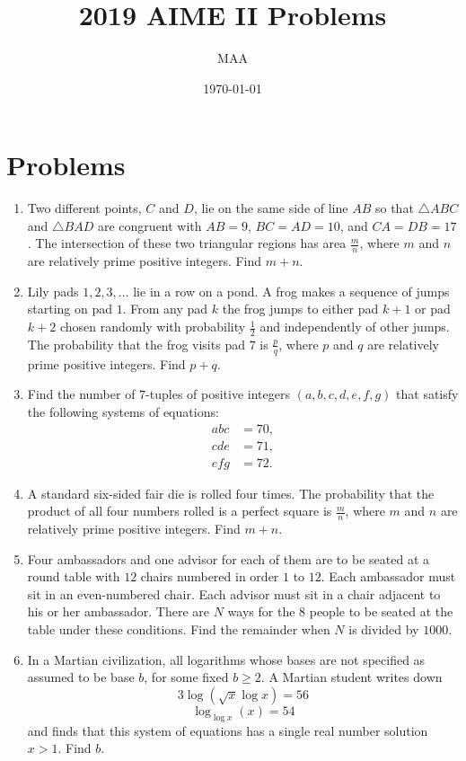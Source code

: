 \documentclass{article}%
\title{2019 AIME II Problems}%
\author{MAA}%
\date{\today}%
\begin{document}
%
\normalsize%
\maketitle%
\section{Problems}%
\label{sec:Problems}%
\begin{enumerate}%
\item%
Two different points, $C$ and $D$, lie on the same side of line $AB$ so that $\triangle ABC$ and $\triangle BAD$ are congruent with $AB = 9$, $BC=AD=10$, and $CA=DB=17$. The intersection of these two triangular regions has area $\frac mn$, where $m$ and $n$ are relatively prime positive integers. Find $m+n$.
%
\item%
Lily pads $1,2,3,\ldots$ lie in a row on a pond. A frog makes a sequence of jumps starting on pad $1$. From any pad $k$ the frog jumps to either pad $k+1$ or pad $k+2$ chosen randomly with probability $\frac{1}{2}$ and independently of other jumps. The probability that the frog visits pad $7$ is $\frac{p}{q}$, where $p$ and $q$ are relatively prime positive integers. Find $p+q$.
%
\item%
Find the number of $7$-tuples of positive integers $(a,b,c,d,e,f,g)$ that satisfy the following systems of equations:
\begin{align*} abc&=70,\\ cde&=71,\\ efg&=72. \end{align*}
%
\item%
A standard six-sided fair die is rolled four times. The probability that the product of all four numbers rolled is a perfect square is $\frac{m}{n}$, where $m$ and $n$ are relatively prime positive integers. Find $m+n$.
%
\item%
Four ambassadors and one advisor for each of them are to be seated at a round table with $12$ chairs numbered in order $1$ to $12$. Each ambassador must sit in an even-numbered chair. Each advisor must sit in a chair adjacent to his or her ambassador. There are $N$ ways for the $8$ people to be seated at the table under these conditions. Find the remainder when $N$ is divided by $1000$.
%
\item%
In a Martian civilization, all logarithms whose bases are not specified as assumed to be base $b$, for some fixed $b\ge2$. A Martian student writes down
\[3\log(\sqrt{x}\log x)=56\]
\[\log_{\log x}(x)=54\]
and finds that this system of equations has a single real number solution $x>1$. Find $b$.

\end{enumerate}
\end{document}
